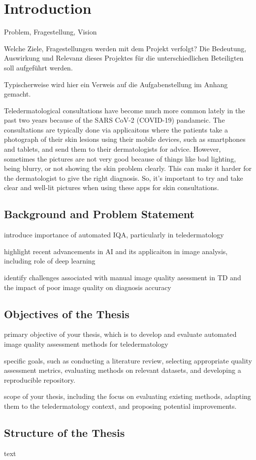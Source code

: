 \chapter{Introduction}
\label{ch:Introduction}
Problem, Fragestellung, Vision

Welche Ziele, Fragestellungen werden mit dem Projekt verfolgt? Die Bedeutung, Auswirkung und Relevanz dieses Projektes für die unterschiedlichen Beteiligten soll aufgeführt werden.

Typischerweise wird hier ein Verweis auf die Aufgabenstellung im Anhang gemacht. \par
\vspace{\baselineskip}
\noindent
Teledermatological consultations have become much more common lately in the past two years because of the SARS CoV-2 (COVID-19) pandameic. The consultations are typically done via applicaitons where the patients take a photograph of their skin lesions using their mobile devices, such as smartphones and tablets, and send them to their dermatologists for advice. However, sometimes the pictures are not very good because of things like bad lighting, being blurry, or not showing the skin problem clearly. This can make it harder for the dermatologist to give the right diagnosis. So, it's important to try and take clear and well-lit pictures when using these apps for skin consultations.
\par
\vspace{\baselineskip}
\noindent

\section{Background and Problem Statement}
\label{sec:BackgroundProblemStatement}
introduce importance of automated IQA, particularly in teledermatology \par 
highlight recent advancements in AI and its applicaiton in image analysis, including role of deep learning \par
identify challenges associated with manual image quality asessment in TD and the impact of poor image quality on diagnosis accuracy \par

\vspace{\baselineskip}
\noindent

\section{Objectives of the Thesis}
\label{sec:Objectives}
primary objective of your thesis, which is to develop and evaluate automated image quality assessment methods for teledermatology \par 
specific goals, such as conducting a literature review, selecting appropriate quality assessment metrics, evaluating methods on relevant datasets, and developing a reproducible repository. \par
scope of your thesis, including the focus on evaluating existing methods, adapting them to the teledermatology context, and proposing potential improvements. \par
\vspace{\baselineskip}
\noindent

\section{Structure of the Thesis}
\label{sec:Structure}
text \par
\vspace{\baselineskip}
\noindent
